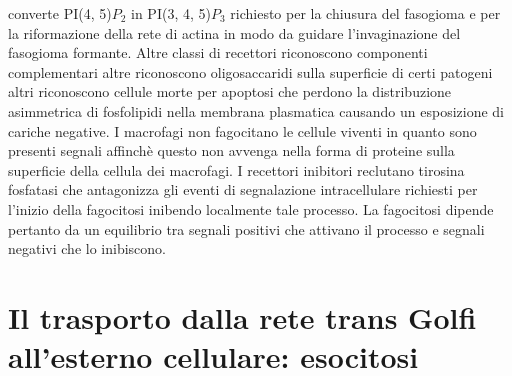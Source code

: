 converte PI(4, 5)$P_2$ in PI(3, 4, 5)$P_3$ richiesto per la chiusura del fasogioma e per la riformazione della rete di actina in modo da guidare l'invaginazione del fasogioma formante. 
Altre classi di recettori riconoscono componenti complementari altre riconoscono oligosaccaridi sulla superficie di certi patogeni altri riconoscono cellule morte per apoptosi che 
perdono la distribuzione asimmetrica di fosfolipidi nella membrana plasmatica causando un esposizione di cariche negative. I macrofagi non fagocitano le cellule viventi in quanto 
sono presenti segnali affinch\`e questo non avvenga nella forma di proteine sulla superficie della cellula dei macrofagi. I recettori inibitori reclutano tirosina fosfatasi che 
antagonizza gli eventi di segnalazione intracellulare richiesti per l'inizio della fagocitosi inibendo localmente tale processo. La fagocitosi dipende pertanto da un equilibrio tra
segnali positivi che attivano il processo e segnali negativi che lo inibiscono.
\section{Il trasporto dalla rete trans Golfi all'esterno cellulare: esocitosi}
